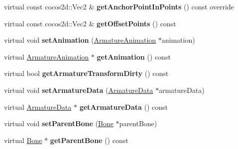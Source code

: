 \begin{DoxyCompactItemize}
\mbox{\label{classcocostudio_1_1Armature_a03a4d4eab2182448cc8ca75dbcdca7aa}} 
virtual const cocos2d\+::\+Vec2 \& {\bfseries get\+Anchor\+Point\+In\+Points} () const override
\item 
\mbox{\label{classcocostudio_1_1Armature_a3b99eefff1a9dff39729ae3eb28cc275}} 
virtual const cocos2d\+::\+Vec2 \& {\bfseries get\+Offset\+Points} () const
\item 
\mbox{\label{classcocostudio_1_1Armature_a20b3d48808acef4b0d42f1e5b27c1e4e}} 
virtual void {\bfseries set\+Animation} (\hyperlink{classcocostudio_1_1ArmatureAnimation}{Armature\+Animation} $\ast$animation)
\item 
\mbox{\label{classcocostudio_1_1Armature_a60da8b6b110a7dadd2c0f345017bc0cb}} 
virtual \hyperlink{classcocostudio_1_1ArmatureAnimation}{Armature\+Animation} $\ast$ {\bfseries get\+Animation} () const
\item 
\mbox{\label{classcocostudio_1_1Armature_a260df92f322ad478a3ab019a453965ca}} 
virtual bool {\bfseries get\+Armature\+Transform\+Dirty} () const
\item 
\mbox{\label{classcocostudio_1_1Armature_ae1796e26e80c5804e3a255981e2b5acc}} 
virtual void {\bfseries set\+Armature\+Data} (\hyperlink{classcocostudio_1_1ArmatureData}{Armature\+Data} $\ast$armature\+Data)
\item 
\mbox{\label{classcocostudio_1_1Armature_aa90068e13db10e4e1c058e6468fc00ed}} 
virtual \hyperlink{classcocostudio_1_1ArmatureData}{Armature\+Data} $\ast$ {\bfseries get\+Armature\+Data} () const
\item 
\mbox{\label{classcocostudio_1_1Armature_a42c7f95393732fa3d2badc691551e2c4}} 
virtual void {\bfseries set\+Parent\+Bone} (\hyperlink{classcocostudio_1_1Bone}{Bone} $\ast$parent\+Bone)
\item 
\mbox{\label{classcocostudio_1_1Armature_afd8d70c1ce3ee117b18dfb8a0f1322d4}} 
virtual \hyperlink{classcocostudio_1_1Bone}{Bone} $\ast$ {\bfseries get\+Parent\+Bone} () const

\end{DoxyCompactItemize}
